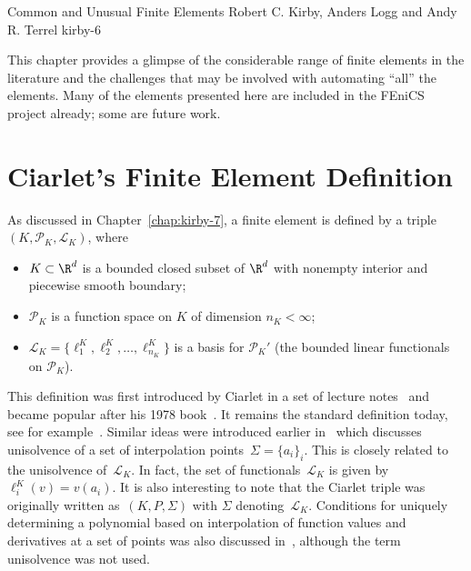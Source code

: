               {Common and Unusual Finite Elements}
              {Robert C. Kirby, Anders Logg and Andy R. Terrel}
              {kirby-6}

\newcommand{\elemententry}[1]{\null

\texttt{[image: \#1]}}

This chapter provides a glimpse of the considerable range of finite
elements in the literature and the challenges that may be involved
with automating ``all'' the elements. Many of the elements presented
here are included in the FEniCS project already; some are future work.

\section{Ciarlet's Finite Element Definition}

As discussed in Chapter~\ref{chap:kirby-7}, a finite element is defined by a
triple $(K, \mathcal{P}_K, \mathcal{L}_K)$, where
\begin{itemize}
\item
  $K \subset \R^d$ is a bounded closed subset of $\R^d$ with nonempty
  interior and piecewise smooth boundary;
\item
  $\mathcal{P}_K$ is a function space on $K$ of dimension $n_K < \infty$;
\item
  $\mathcal{L}_K = \{\ell^K_1, \ell^K_2, \ldots, \ell^K_{n_K}\}$ is a
  basis for $\mathcal{P}_K'$ (the bounded linear functionals on
  $\mathcal{P}_K$).
\end{itemize}

This definition was first introduced by Ciarlet in a set of lecture
notes~\cite{Ciarlet1975} and became popular after his 1978
book~\cite{Ciarlet1978,Ciarlet2002}. It remains the standard
definition today, see for example~\cite{BrennerScott2008}. Similar
ideas were introduced earlier in~\cite{CiarletRaviart1972} which
discusses unisolvence of a set of interpolation points~$\Sigma =
\{a_i\}_i$. This is closely related to the unisolvence of~$\mathcal{L}_K$. In fact, the set of
functionals~$\mathcal{L}_K$ is given by $\ell^K_i(v) = v(a_i)$. It is
also interesting to note that the Ciarlet triple was originally
written as~$(K,P,\Sigma)$ with $\Sigma$
denoting~$\mathcal{L}_K$. Conditions for uniquely determining a
polynomial based on interpolation of function values and derivatives
at a set of points was also discussed in~\cite{BrambleZlamal1970},
although the term unisolvence was not used.

